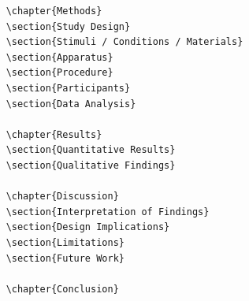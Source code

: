 \begin{verbatim}
	\chapter{Methods} 
	\section{Study Design}
	\section{Stimuli / Conditions / Materials}
	\section{Apparatus}
	\section{Procedure}
	\section{Participants}
	\section{Data Analysis} 
	
	\chapter{Results}
	\section{Quantitative Results}
	\section{Qualitative Findings}
	
	\chapter{Discussion}
	\section{Interpretation of Findings} 
	\section{Design Implications} 
	\section{Limitations}
	\section{Future Work}
	
	\chapter{Conclusion} 
\end{verbatim}

